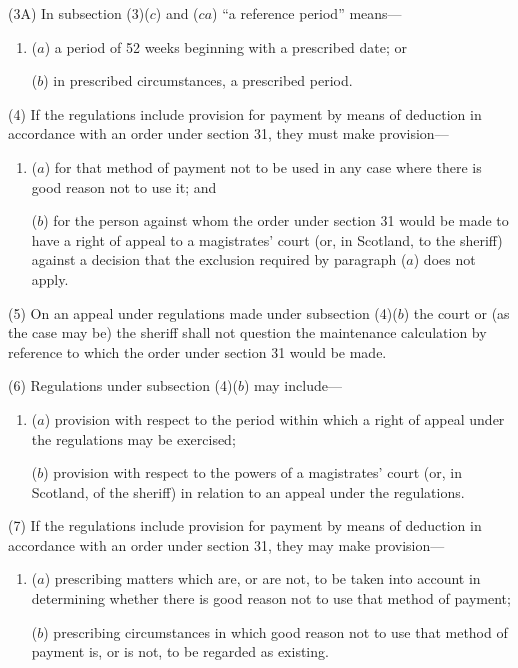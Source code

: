 \documentclass[a4paper]{article}
\begin{document}
(3A) In subsection (3)($c$) and ($ca$) “a reference period” means—
\begin{enumerate}\item[]
($a$) a period of 52 weeks beginning with a prescribed date; or

($b$) in prescribed circumstances, a prescribed period.
\end{enumerate}

(4) If the regulations include provision for payment by means of deduction in accordance with an order under section 31, they must make provision---
\begin{enumerate}\item[]
($a$) for that method of payment not to be used in any case where there is good
reason not to use it; and

($b$) for the person against whom the order under section 31 would be made to
have a right of appeal to a magistrates’ court (or, in Scotland, to the sheriff)
against a decision that the exclusion required by paragraph ($a$) does not
apply.
\end{enumerate}

(5) On an appeal under regulations made under subsection (4)($b$) the court or (as the case may be) the sheriff shall not question the maintenance calculation by reference to which the order under section 31 would be made.

(6) Regulations under subsection (4)($b$) may include---
\begin{enumerate}\item[]
($a$) provision with respect to the period within which a right of appeal under the
regulations may be exercised;

($b$) provision with respect to the powers of a magistrates’ court (or, in Scotland, of 
the sheriff) in relation to an appeal under the regulations.
\end{enumerate}

(7) If the regulations include provision for payment by means of deduction in accordance with an order under section 31, they may make provision---
\begin{enumerate}\item[]
($a$) prescribing matters which are, or are not, to be taken into account in determining whether there is good reason not to use that method of payment;

($b$) prescribing circumstances in which good reason not to use that method of payment is, or is not, to be regarded as existing.
\end{enumerate}
\end{document}
